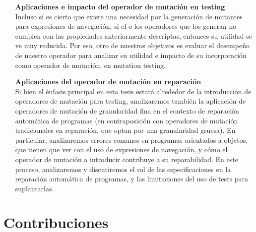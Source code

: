 \begin{enumerate}[leftmargin=.75cm,align=left,style=nextline]
	\item[\textbf{Aplicaciones e impacto del operador de mutaci\'on en testing}]\mbox{}\\
	Incluso si es cierto que existe una necesidad por la generaci\'on de mutantes para expresiones de navegaci\'on, si el o los operadores que los generan no cumplen con las propiedades anteriormente descriptas, entonces su utilidad se ve muy reducida. Por eso, otro de nuestros objetivos es evaluar el desempe\~no de nuestro operador para analizar su utilidad e impacto de su incorporaci\'on como operador de mutaci\'on, en mutation testing. 
	
    \item[\textbf{Aplicaciones del operador de mutaci\'on en reparaci\'on}]\mbox{}\\
	Si bien el \'enfasis principal en esta tesis estar\'a alrededor de la introducci\'on de operadores de mutaci\'on para testing, analizaremos tambi\'en la aplicaci\'on de operadores de mutaci\'on de granularidad fina en el contexto de reparaci\'on autom\'atica de programas (en contraposici\'on con operadores de mutaci\'on tradicionales en reparaci\'on, que optan por una granularidad gruesa). En particular, analizaremos errores comunes en programas orientados a objetos, que tienen que ver con el uso de expresiones de navegaci\'on, y c\'omo el operador de mutaci\'on a introducir contribuye a su reparabilidad. En este proceso, analizaremos y discutiremos el rol de las especificaciones en la reparaci\'on autom\'atica de programas, y las limitaciones del uso de tests para suplantarlas. 
\end{enumerate}


\section{Contribuciones}
\label{sec:intro.contribuciones}


